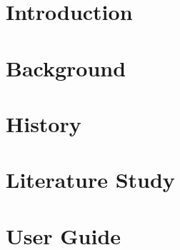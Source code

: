 \documentclass[10pt]{article}
\begin{document}
\section*{Introduction}

\section*{Background}

\section*{History}

\section*{Literature Study}

\section*{User Guide}
\end{document}
